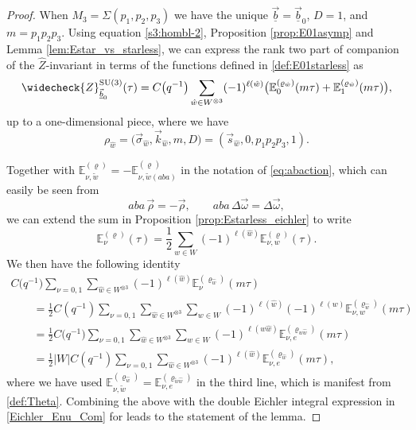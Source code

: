 \documentclass[10pt,a4paper]{amsart}
\def\BE{\mathbb{E}}
\def\bos{\varrho}
\def\bv{{\vec{\underline{b}}}}
\theoremstyle{definition}
\numberwithin{equation}{section}
\begin{document}
\begin{proof}
When $M_3=\Sigma(p_1,p_2,p_3)$ we have the unique $\bv=\bv_0$, $D=1$, and $m=p_1p_2p_3$. Using equation \eqref{s3:hombl-2}, Proposition \ref{prop:E01asymp} and Lemma \ref{lem:Estar_vs_starless}, we can express the rank two part of companion of the $\widehat{Z}$-invariant in terms of the functions \smash{$\BE_\nu^{(\bos)}(\tau)$} defined in \eqref{def:E01starless} as
	\begin{equation*}%
	\widecheck{Z}^{{\rm SU}(3)}_{\bv_0}(\tau)=
	C\bigl(q^{-1}\bigr) \sum\limits_{\hat{w} \in
	W^{\otimes 3}}(-1)^{\ell(\hat w)}
 \bigl(\mathbb{E}^{(\bos_{\hat{w}})}_0(m\tau)+
 \mathbb{E}^{(\bos_{\hat{w}})}_1({m}\tau)\bigr),
	\end{equation*}
up to a one-dimensional piece, where we have \[\rho_{\hat w} = \bigl(\vec{\sigma}_{\hat w},\vec{k}_{\hat w},m,D\bigr) = (\vec{s}_{\hat w}, 0, p_1p_2p_3, 1).\]

Together with $\BE_{\nu,\tilde w}^{(\bos)} = -
\BE_{\nu,\tilde w (aba)}^{(\bos_{})}$ in the notation of \eqref{eq:abaction}, which can easily be seen from
\[
aba \, \vec\rho=-\vec\rho, \qquad aba \, \Delta \vec\omega = \Delta \vec\omega,
\]
we can extend the sum in Proposition \ref{prop:Estarless_eichler} to write
\[%
	\BE_\nu^{(\bos)}(\tau) = {\frac{1}{2}} \sum_{{w} \in W} (-1)^{\ell(\hat w)} \BE_{\nu,w}^{(\bos)}(\tau).
\]
We then have the following identity
	\begin{gather*}
	C \bigl(q^{-1}\bigr)\sum_{\nu=0,1} \sum\limits_{\hat{w} \in
	W^{\otimes 3}}(-1)^{\ell(\hat w)}
\mathbb{E}^{(\bos_{\hat{w}})}_\nu(m\tau)
 \\ \qquad ={\frac{1}{2}}C (q^{-1})\sum_{\nu=0,1}
 \sum\limits_{\hat{w} \in
	W^{\otimes 3}} \sum_{{w} \in W} (-1)^{\ell(\hat w)} (-1)^{\ell(w)} \BE_{\nu,w}^{(\bos_{\hat w})}(m\tau) \\
	\qquad = {\frac{1}{2}}C \bigl(q^{-1}\bigr)\sum_{\nu=0,1}
 \sum\limits_{\hat{w} \in
	W^{\otimes 3}} \sum_{{w} \in W} (-1)^{\ell(w\hat w)}
	\BE_{\nu,e}^{(\bos_{w\hat w})}(m\tau)
	\\ \qquad = {\frac{1}{2}} |W|C (q^{-1})\sum_{\nu=0,1}
 \sum\limits_{\hat{w} \in
	W^{\otimes 3}} (-1)^{\ell(\hat w)}
	\BE_{\nu,e}^{(\bos_{\hat w})}(m\tau),
\end{gather*}
where we have used $\BE_{\nu,\tilde w}^{(\bos_{\hat w})} =
\BE_{\nu,e}^{(\bos_{\tilde w \hat w})}$ in the third line, which is manifest from \eqref{def:Theta}. Combining the above with the double Eichler integral expression in \eqref{Eichler_Enu_Com} for \smash{$\BE_{\nu,\tilde w}^{(\bos_{\hat w})}$} leads to the statement of the lemma.
\end{proof}
\end{document}
